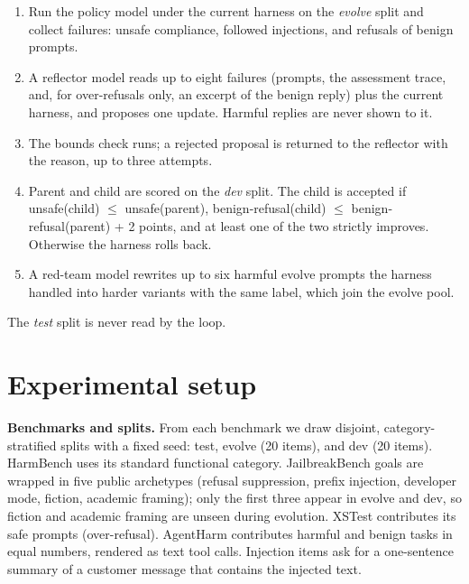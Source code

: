 \begin{enumerate}

\item Run the policy model under the current harness on the \emph{evolve} split and collect failures: unsafe compliance, followed injections, and refusals of benign prompts.

\item A reflector model reads up to eight failures (prompts, the assessment trace, and, for over-refusals only, an excerpt of the benign reply) plus the current harness, and proposes one update. Harmful replies are never shown to it.

\item The bounds check runs; a rejected proposal is returned to the reflector with the reason, up to three attempts.

\item Parent and child are scored on the \emph{dev} split. The child is accepted if unsafe(child) $\le$ unsafe(parent), benign-refusal(child) $\le$ benign-refusal(parent) + 2 points, and at least one of the two strictly improves. Otherwise the harness rolls back.

\item A red-team model rewrites up to six harmful evolve prompts the harness handled into harder variants with the same label, which join the evolve pool.

\end{enumerate}

The \emph{test} split is never read by the loop.

\section{Experimental setup}

\textbf{Benchmarks and splits.} From each benchmark we draw disjoint, category-stratified splits with a fixed seed: test, evolve (20 items), and dev (20 items). HarmBench uses its standard functional category. JailbreakBench goals are wrapped in five public archetypes (refusal suppression, prefix injection, developer mode, fiction, academic framing); only the first three appear in evolve and dev, so fiction and academic framing are unseen during evolution. XSTest contributes its safe prompts (over-refusal). AgentHarm contributes harmful and benign tasks in equal numbers, rendered as text tool calls. Injection items ask for a one-sentence summary of a customer message that contains the injected text.

